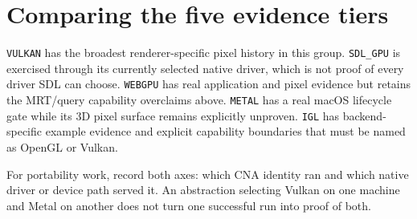 \section{Comparing the five evidence tiers}

\texttt{VULKAN} has the broadest renderer-specific pixel history in this group.
\texttt{SDL\_GPU} is exercised through its currently selected native driver, which is not
proof of every driver SDL can choose.  \texttt{WEBGPU} has real application and pixel
evidence but retains the MRT/query capability overclaims above. \texttt{METAL} has a real
macOS lifecycle gate while its 3D pixel surface remains explicitly unproven. \texttt{IGL} has
backend-specific example evidence and explicit capability boundaries that must be named as
OpenGL or Vulkan.

For portability work, record both axes: which CNA identity ran and which native driver or
device path served it.  An abstraction selecting Vulkan on one machine and Metal on another
does not turn one successful run into proof of both.




